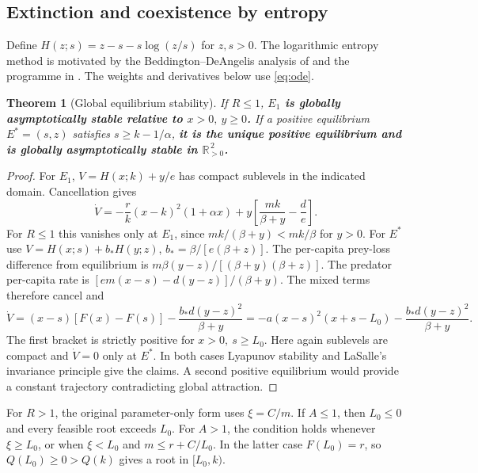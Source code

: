 \documentclass[12pt,a4paper,twoside,fleqn]{article}
\theoremstyle{journal}
\newtheorem{theorem}{Theorem}
\newcommand{\claim}[1]{{\normalfont\bfseries\boldmath #1}}
\newcommand{\pos}{\mathbb R_{>0}^{\,2}}
\begin{document}
\subsection{Extinction and coexistence by entropy}
Define \(H(z;s)=z-s-s\log(z/s)\) for \(z,s>0\). The logarithmic entropy method is motivated by the Beddington--DeAngelis analysis of \citet{cantrell01} and the programme in \citet{haque11}. The weights and derivatives below use \eqref{eq:ode}.

\begin{theorem}[Global equilibrium stability]\label{thm:entropy}
If \(R\le1\), \claim{\(E_1\) is globally asymptotically stable relative to \(x>0,\ y\ge0\).} If a positive equilibrium \(E^*=(s,z)\) satisfies \(s\ge k-1/\alpha\), \claim{it is the unique positive equilibrium and is globally asymptotically stable in \(\pos\).}
\end{theorem}
\begin{proof}
For \(E_1\), \(V=H(x;k)+y/e\) has compact sublevels in the indicated domain. Cancellation gives
\[
 \dot V=-\frac r k(x-k)^2(1+\alpha x)
       +y\left[\frac{mk}{\beta+y}-\frac de\right].
\]
For \(R\le1\) this vanishes only at \(E_1\), since \(mk/(\beta+y)<mk/\beta\) for \(y>0\). For \(E^*\) use \(V=H(x;s)+b_* H(y;z)\), \(b_*=\beta/[e(\beta+z)]\). The per-capita prey-loss difference from equilibrium is \(m\beta(y-z)/[(\beta+y)(\beta+z)]\). The predator per-capita rate is \([em(x-s)-d(y-z)]/(\beta+y)\). The mixed terms therefore cancel and
\[
 \dot V=(x-s)[F(x)-F(s)]-\frac{b_*d(y-z)^2}{\beta+y}
       =-a(x-s)^2(x+s-L_0)-\frac{b_*d(y-z)^2}{\beta+y}.
\]
The first bracket is strictly positive for \(x>0,\ s\ge L_0\). Here again sublevels are compact and \(\dot V=0\) only at \(E^*\). In both cases Lyapunov stability and LaSalle's invariance principle give the claims. A second positive equilibrium would provide a constant trajectory contradicting global attraction.
\end{proof}

For \(R>1\), the original parameter-only form uses \(\xi=C/m\). If \(A\le1\), then \(L_0\le0\) and every feasible root exceeds \(L_0\). For \(A>1\), the condition holds whenever \(\xi\ge L_0\), or when \(\xi<L_0\) and \(m\le r+C/L_0\). In the latter case \(F(L_0)=r\), so \(Q(L_0)\ge0>Q(k)\) gives a root in \([L_0,k)\).
\end{document}
